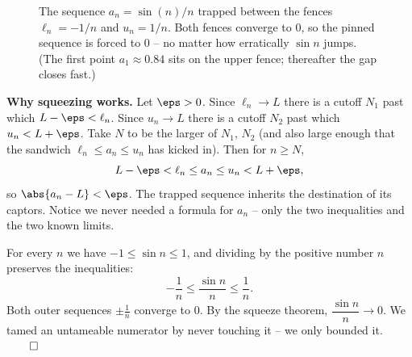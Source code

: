 \begin{figure}[H]
\centering
{}
\caption{The sequence $a_n = \sin(n)/n$ trapped between the fences $\ell_n =
-1/n$ and $u_n = 1/n$. Both fences converge to $0$, so the pinned sequence is
forced to $0$ -- no matter how erratically $\sin n$ jumps. (The first point
$a_1 \approx 0.84$ sits on the upper fence; thereafter the gap closes fast.)}
\label{ch28:fig-squeeze}
\end{figure}

\begin{whybox}
\textbf{Why squeezing works.} Let $\eps > 0$. Since $\ell_n \to L$ there is a
cutoff $N_1$ past which $L - \eps < \ell_n$. Since $u_n \to L$ there is a cutoff
$N_2$ past which $u_n < L + \eps$. Take $N$ to be the larger of $N_1$, $N_2$ (and
also large enough that the sandwich $\ell_n \le a_n \le u_n$ has kicked in). Then
for $n \ge N$,
\[
  L - \eps < \ell_n \le a_n \le u_n < L + \eps,
\]
so $\abs{a_n - L} < \eps$. The trapped sequence inherits the destination of its
captors. Notice we never needed a formula for $a_n$ -- only the two inequalities
and the two known limits.
\end{whybox}

\begin{example}[$\sin n / n \to 0$]
\label{ch28:ex-sinn}
For every $n$ we have $-1 \le \sin n \le 1$, and dividing by the positive number
$n$ preserves the inequalities:
\[
  -\frac1n \le \frac{\sin n}{n} \le \frac1n .
\]
Both outer sequences $\pm\tfrac1n$ converge to $0$. By the squeeze theorem,
$\dfrac{\sin n}{n} \to 0$. We tamed an untameable numerator by never touching it
-- we only bounded it. $\qed$
\end{example}


